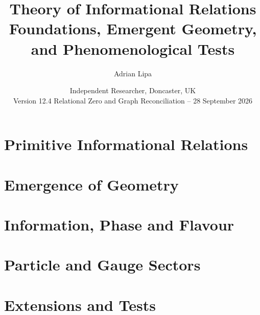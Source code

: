 \documentclass[11pt,a4paper,twoside]{book}
\theoremstyle{definition}
\begin{document}
\raggedbottom
\frontmatter
\title{Theory of Informational Relations\\\large Foundations, Emergent Geometry, and Phenomenological Tests}
\author{Adrian Lipa}
\date{Independent Researcher, Doncaster, UK\\Version 12.4 Relational Zero and Graph Reconciliation -- 28 September 2026}
\maketitle

\tableofcontents
\mainmatter

\part{Primitive Informational Relations}




\part{Emergence of Geometry}





\part{Information, Phase and Flavour}





\part{Particle and Gauge Sectors}







\part{Extensions and Tests}




\end{document}
